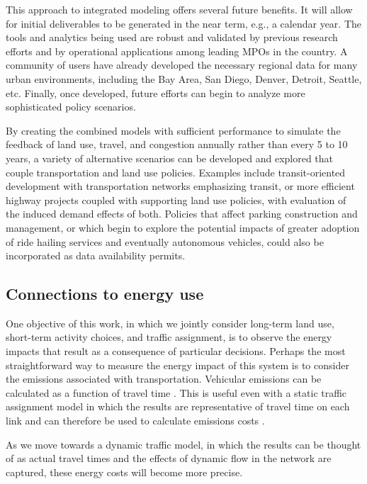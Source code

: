 This approach to integrated modeling offers several future benefits. It will allow for initial deliverables to be generated in the near term, e.g., a calendar year. The tools and analytics being used are robust and validated by previous research efforts and by operational applications among leading MPOs in the country. A community of users have already developed the necessary regional data for many urban environments, including the Bay Area, San Diego, Denver, Detroit, Seattle, etc. Finally, once developed, future efforts can begin to analyze more sophisticated policy scenarios.

By creating the combined models with sufficient performance to simulate the feedback of land use, travel, and congestion annually rather than every 5 to 10 years, a variety of alternative scenarios can be developed and explored that couple transportation and land use policies. Examples include transit-oriented development with transportation networks emphasizing transit, or more efficient highway projects coupled with supporting land use policies, with evaluation of the induced demand effects of both. Policies that affect parking construction and management, or which begin to explore the potential impacts of greater adoption of ride hailing services and eventually autonomous vehicles, could also be incorporated as data availability permits.

\subsection{Connections to energy use}

One objective of this work, in which we jointly consider long-term land use, short-term activity choices, and traffic assignment, is to observe the energy impacts that result as a consequence of particular decisions. Perhaps the most straightforward way to measure the energy impact of this system is to consider the emissions associated with transportation. Vehicular emissions can be calculated as a function of travel time \citep{ahn2008effects}. This is useful even with a static traffic assignment model in which the results are representative of travel time on each link and can therefore be used to calculate emissions costs \citep{aziz2012integration}.

As we move towards a dynamic traffic model, in which the results can be thought of as actual travel times and the effects of dynamic flow in the network are captured, these energy costs will become more precise.

